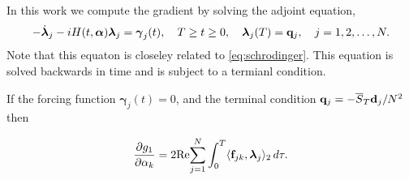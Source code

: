 \documentclass[11pt]{article}
\begin{document}
In this work we compute the gradient by solving the adjoint equation,
\begin{equation}\label{eq:adjoint}
-\dot{\boldsymbol{\lambda}}_j - iH(t,\boldsymbol{\alpha})\boldsymbol{\lambda}_j=\boldsymbol{\gamma}_j(t),\quad T\geq t\geq 0, \quad \boldsymbol{\lambda}_j(T)={\mathbf q}_j,\quad j=1,2,\ldots,N.
\end{equation}
%
Note that this equaton is closeley related to \ref{eq:schrodinger}. This equation is solved backwards in time and is subject to a termianl condition.

\begin{theorem}
If the forcing function $\boldsymbol{\gamma}_j(t) = 0$, and the terminal condition ${\mathbf q}_j = -\overline{S}_T {\mathbf d}_j/N^2$ then

\begin{equation}\label{eq:sensitivity}
  \frac{\partial g_1}{\partial \alpha_k} = 
  2 {\rm Re}\! \sum_{j=1}^N \int_0^T \langle {\mathbf f}_{jk},\boldsymbol{\lambda}_j \rangle_2\, d\tau.
\end{equation}
\end{theorem}
\end{document}
